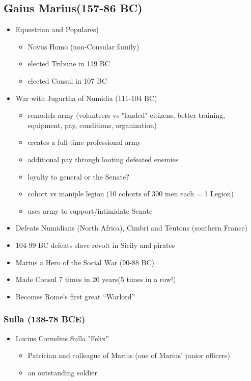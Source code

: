 \documentclass[12pt, twoside]{article}
\begin{document}
\subsection{Gaius Marius(157-86 BC)}
\begin{itemize}
\item Equestrian and Populares)
	\begin{itemize}
	\item Novus Homo (non-Consular family)
	\item elected Tribune in 119 BC
	\item elected Consul in 107 BC
	\end{itemize}
\item War with Jugurtha of Numidia (111-104 BC)
	\begin{itemize}
	\item remodels army (volunteers vs "landed" citizens, better training, equipment, pay, conditions, organization) 
	\item creates a full-time professional army
	\item additional pay through looting defeated enemies
	\item loyalty to general or the Senate?
	\item cohort vs maniple legion (10 cohorts of 300 men each = 1 Legion)
	\item uses army to support/intimidate Senate
	\end{itemize}
\item Defeats Numidians (North Africa), Cimbri and Teutons (southern France)
\item 104-99 BC defeats slave revolt in Sicily and pirates
\item Marius a Hero of the Social War (90-88 BC)
\item Made Consul 7 times in 20 years(5 times in a row!)
\item Becomes Rome’s first great “Warlord”
\end{itemize}

\subsubsection{Sulla (138-78 BCE)}
\begin{itemize}
\item Lucius Cornelius Sulla "Felix”
	\begin{itemize}
	\item Patrician and colleague of Marius (one of Marius’ junior officers)
	\item an outstanding soldier
	\end{itemize}
\end{itemize}
\end{document}
